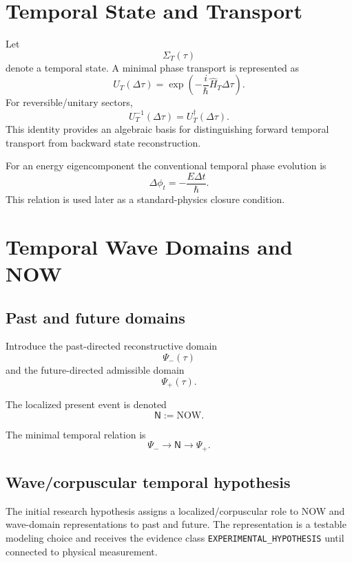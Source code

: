 \documentclass[11pt,a4paper]{book}
\newcommand{\Now}{\mathsf{N}}
\newcommand{\Past}{\Psi_{-}}
\newcommand{\Future}{\Psi_{+}}
\begin{document}
\chapter{Temporal State and Transport}
Let
\begin{equation}
\Sigma_T(\tau)
\end{equation}
denote a temporal state. A minimal phase transport is represented as
\begin{equation}
U_T(\Delta\tau)
=
\exp\left(-\frac{i}{\hbar}\hat H_T\Delta\tau\right).
\end{equation}
For reversible/unitary sectors,
\begin{equation}
U_T^{-1}(\Delta\tau)=U_T^\dagger(\Delta\tau).
\end{equation}
This identity provides an algebraic basis for distinguishing forward temporal transport from backward state reconstruction.

For an energy eigencomponent the conventional temporal phase evolution is
\begin{equation}
\Delta\phi_t=-\frac{E\Delta t}{\hbar}.
\end{equation}
This relation is used later as a standard-physics closure condition.

\chapter{Temporal Wave Domains and NOW}
\section{Past and future domains}
Introduce the past-directed reconstructive domain
\begin{equation}
\Past(\tau)
\end{equation}
and the future-directed admissible domain
\begin{equation}
\Future(\tau).
\end{equation}

The localized present event is denoted
\begin{equation}
\Now:=\mathrm{NOW}.
\end{equation}

The minimal temporal relation is
\begin{equation}
\Past\longrightarrow\Now\longrightarrow\Future.
\end{equation}

\section{Wave/corpuscular temporal hypothesis}
The initial research hypothesis assigns a localized/corpuscular role to NOW and wave-domain representations to past and future. The representation is a testable modeling choice and receives the evidence class \texttt{EXPERIMENTAL\_HYPOTHESIS} until connected to physical measurement.
\end{document}
